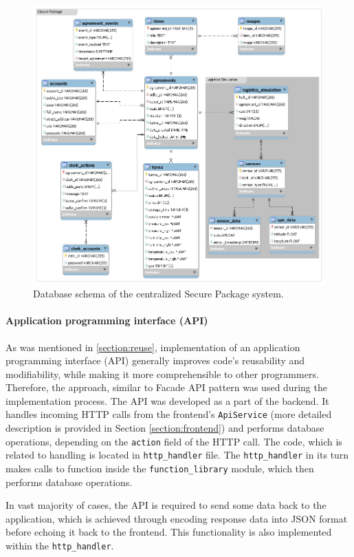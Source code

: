 \begin{figure}[H]
\centering
\includegraphics[scale=0.4]{images/database.png}
\caption{Database schema of the centralized Secure Package system.}
\label{fig:databaseschema}
\end{figure}

\paragraph{Application programming interface (API)}
As was mentioned in \ref{section:reuse}, implementation of an application programming interface (API) generally improves code's reusability and modifiability, while making it more comprehensible to other programmers. Therefore, the approach, similar to Facade API pattern was used during the implementation process. The API was developed as a part of the backend. It handles incoming HTTP calls from the frontend's \texttt{ApiService} (more detailed description is provided in Section \ref{section:frontend}) and performs database operations, depending on the \texttt{action} field of the HTTP call. The code, which is related to handling is located in \texttt{http\_handler} file. The \texttt{http\_handler} in its turn makes calls to function inside the \texttt{function\_library} module, which then performs database operations. 

In vast majority of cases, the API is required to send some data back to the application, which is achieved through encoding response data into JSON format before echoing it back to the frontend. This functionality is also implemented within the \texttt{http\_handler}.

